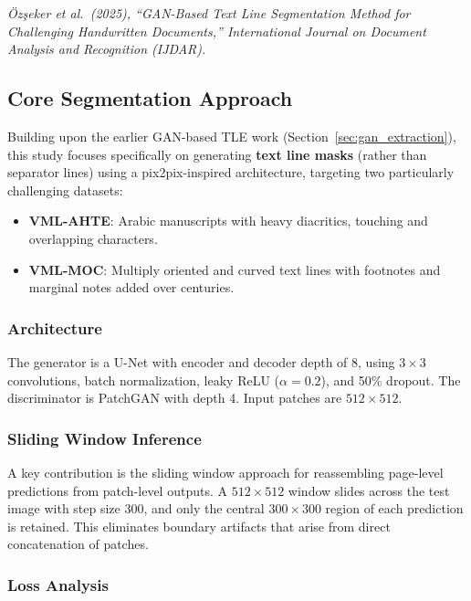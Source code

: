 \documentclass[11pt, a4paper]{article}
\begin{document}
\noindent\textit{\"Oz\c{s}eker et al.\ (2025), ``GAN-Based Text Line Segmentation Method for Challenging Handwritten Documents,'' International Journal on Document Analysis and Recognition (IJDAR).}

\subsection{Core Segmentation Approach}

Building upon the earlier GAN-based TLE work (Section~\ref{sec:gan_extraction}), this study focuses specifically on generating \textbf{text line masks} (rather than separator lines) using a pix2pix-inspired architecture, targeting two particularly challenging datasets:

\begin{itemize}[leftmargin=1.5em]
    \item \textbf{VML-AHTE}: Arabic manuscripts with heavy diacritics, touching and overlapping characters.
    \item \textbf{VML-MOC}: Multiply oriented and curved text lines with footnotes and marginal notes added over centuries.
\end{itemize}

\subsubsection{Architecture}

The generator is a U-Net with encoder and decoder depth of 8, using $3\times3$ convolutions, batch normalization, leaky ReLU ($\alpha=0.2$), and 50\% dropout. The discriminator is PatchGAN with depth 4. Input patches are $512\times512$.

\subsubsection{Sliding Window Inference}

A key contribution is the sliding window approach for reassembling page-level predictions from patch-level outputs. A $512\times512$ window slides across the test image with step size 300, and only the central $300\times300$ region of each prediction is retained. This eliminates boundary artifacts that arise from direct concatenation of patches.

\subsubsection{Loss Analysis}
\end{document}
